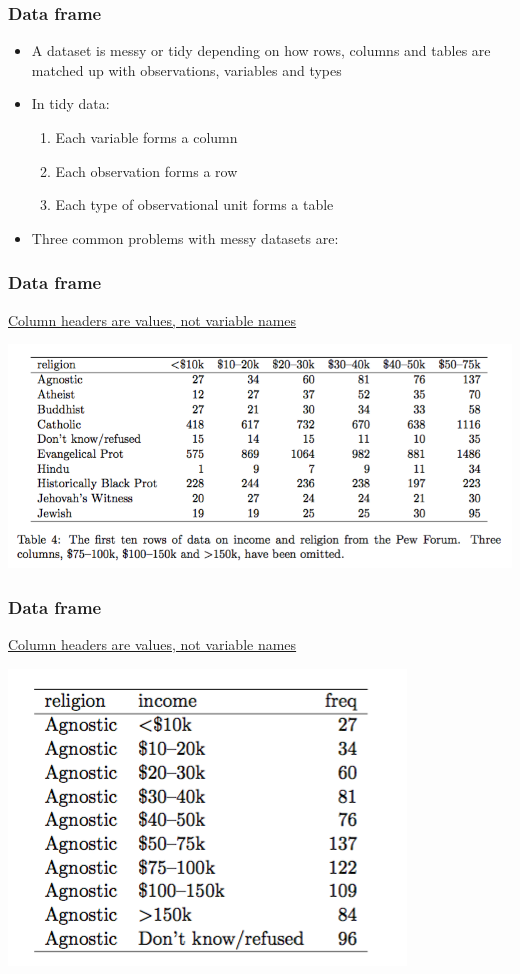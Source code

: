 \documentclass{beamer}
\begin{document}
\begin{frame}[fragile]
	\frametitle{Data frame}
	\begin{itemize}
		\item A dataset is messy or tidy depending on how rows, columns and tables are matched up with observations, variables and types
		\item In tidy data:
			\begin{enumerate}
		\pause
				\item Each variable forms a column
		\pause
				\item Each observation forms a row
		\pause
				\item Each type of observational unit forms a table
			\end{enumerate}
		\pause
		\item Three common problems with messy datasets are:
	\end{itemize}
\end{frame}
\begin{frame}[fragile]
	\frametitle{Data frame}
	\centering \large \underline{Column headers are values, not variable names}
	\vspace{5pt}

	\begin{center} \includegraphics[scale=4.5]{figures/hw_tidy3-1.png} \end{center}
\end{frame} 
\begin{frame}[fragile]
	\frametitle{Data frame}
	\centering \large \underline{Column headers are values, not variable names}
	\vspace{5pt}

	\begin{center}	\includegraphics[scale=0.25]{figures/hw_tidy3-2.png} \end{center}
\end{frame} 
\end{document}
